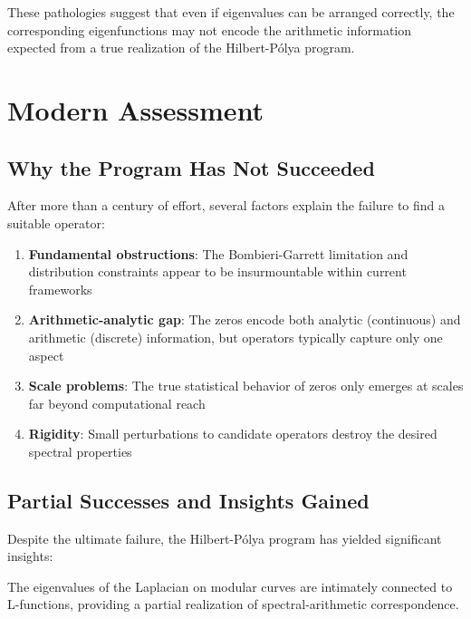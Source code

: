 These pathologies suggest that even if eigenvalues can be arranged correctly, the corresponding eigenfunctions may not encode the arithmetic information expected from a true realization of the Hilbert-Pólya program.

\section{Modern Assessment}
\label{sec:modern_assessment}

\subsection{Why the Program Has Not Succeeded}

After more than a century of effort, several factors explain the failure to find a suitable operator:

\begin{enumerate}
\item \textbf{Fundamental obstructions}: The Bombieri-Garrett limitation and distribution constraints appear to be insurmountable within current frameworks

\item \textbf{Arithmetic-analytic gap}: The zeros encode both analytic (continuous) and arithmetic (discrete) information, but operators typically capture only one aspect

\item \textbf{Scale problems}: The true statistical behavior of zeros only emerges at scales far beyond computational reach

\item \textbf{Rigidity}: Small perturbations to candidate operators destroy the desired spectral properties
\end{enumerate}

\subsection{Partial Successes and Insights Gained}

Despite the ultimate failure, the Hilbert-Pólya program has yielded significant insights:

\begin{theorem}
\label{thm:automorphic_connections}
The eigenvalues of the Laplacian on modular curves are intimately connected to L-functions, providing a partial realization of spectral-arithmetic correspondence.
\end{theorem}

